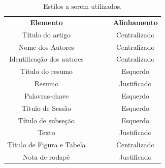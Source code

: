 \documentclass[10pt,brazil,english]{article}
\begin{document}
\begin{table}[!hbtp]
\centering
\caption{Estilos a serem utilizados.}
\label{Tab1}
\begin{tabular}{c|l|l|l|c}
\hline
\multirow{3}{*}{\textbf{Elemento}} & \multirow{3}{*}{\textbf{}} & \multicolumn{2}{l|}{\multirow{2}{*}{\textbf{}}} & \multirow{3}{*}{\textbf{Alinhamento}} \\
                                   &                            & \multicolumn{2}{l|}{}                           &                                       \\ \cline{3-4}
                                   &                            &                        &                        &                                       \\ \hline
Título do artigo                   &                            &                        &                        & Centralizado                          \\ \hline
Nome dos Autores                   &                            &                        &                        & Centralizado                          \\ \hline
Identificação dos autores          &                            &                        &                        & Centralizado                          \\ \hline
Título do resumo                   &                            &                        &                        & Esquerdo                              \\ \hline
Resumo                             &                            &                        &                        & Justificado                           \\ \hline
Palavras-chave                     &                            &                        &                        & Esquerdo                              \\ \hline
Título de Sessão                   &                            &                        &                        & Esquerdo                              \\ \hline
Título de subseção                 &                            &                        &                        & Esquerdo                              \\ \hline
Texto                              &                            &                        &                        & Justificado                           \\ \hline
Título de Figura e Tabela          &                            &                        &                        & Centralizado                          \\ \hline
Nota de rodapé                     &                            &                        &                        & Justificado                           \\ \hline
\end{tabular}

\end{table}
\end{document}
